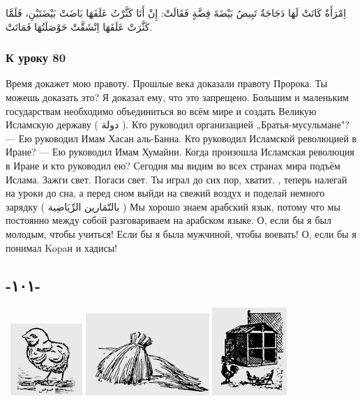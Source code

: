 \documentclass[a5paper]{article}
\newcommand\textstylePolicepardfaut[1]{#1}
\begin{document}
اِمْرَأَةٌ كَانَتْ لَهَا دَجَاجَةٌ تَبِيضُ بَيْضَةَ فِضَّةٍ فَقَالَتْ: إِنْ أَنَا كَثَّرْتُ عَلَفَهَا بَاضَتْ بَيْضَتَيْنِ، فَلَمَّا كَثَّرَتْ عَلَفَهَا اِنْشَقَّتْ حَوْصَلَتُهَا فَمَاتَتْ.

\subsubsection{К уроку 80}
Время докажет мою правоту. Прошлые века доказали правоту Пророка. Ты можешь доказать это? Я доказал ему, что это запрещено. Большим и маленьким государствам необходимо объединиться во всём мире и создать Великую Исламскую державу ( \textstylePolicepardfaut{دولة} ). Кто руководил организацией „Братья-мусульмане"? — Ею руководил Имам Хасан аль-Банна. Кто руководил Исламской революцией в Иране? — Ею руководил Имам Хумайни. Когда произошла Исламская революция в Иране и кто руководил ею? Сегодня мы видим во всех странах мира подъём Ислама. Зажги свет. Погаси свет. Ты играл до сих пор, хватит. , теперь налегай на уроки до сна, а перед сном выйди на свежий воздух и поделай немного зарядку ( \textstylePolicepardfaut{بالتّمَارين الرِّيَاضِية} ) Мы хорошо знаем арабский язык, потому что мы постоянно между собой разговариваем на арабском языке. О, если бы я был молодым, чтобы учиться! Если бы я была мужчиной, чтобы воевать! О, если бы я понимал Kopaн и хадисы!

\subsection{-١٠١-}
\  \includegraphics[width=1.0728in,height=1.0728in]{MuhammadBagauddinlatinized-img274.png}   \includegraphics[width=1.8437in,height=1.2291in]{MuhammadBagauddinlatinized-img275.png}   \includegraphics[width=1.1146in,height=1.3126in]{MuhammadBagauddinlatinized-img276.png} 
\end{document}
